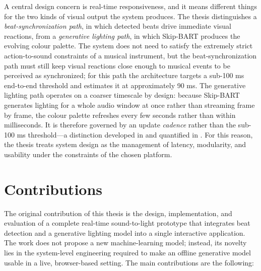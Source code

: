 A central design concern is real-time responsiveness, and it means different things for the two kinds of visual output the system produces. The thesis distinguishes a \emph{beat-synchronization path}, in which detected beats drive immediate visual reactions, from a \emph{generative lighting path}, in which Skip-BART produces the evolving colour palette. The system does not need to satisfy the extremely strict action-to-sound constraints of a musical instrument, but the beat-synchronization path must still keep visual reactions close enough to musical events to be perceived as synchronized; for this path the architecture targets a sub-100 ms end-to-end threshold and estimates it at approximately 90 ms. The generative lighting path operates on a coarser timescale by design: because Skip-BART generates lighting for a whole audio window at once rather than streaming frame by frame, the colour palette refreshes every few seconds rather than within milliseconds. It is therefore governed by an update \emph{cadence} rather than the sub-100 ms threshold---a distinction developed in  and quantified in . For this reason, the thesis treats system design as the management of latency, modularity, and usability under the constraints of the chosen platform.

\section{Contributions}

The original contribution of this thesis is the design, implementation, and evaluation of a complete real-time sound-to-light prototype that integrates beat detection and a generative lighting model into a single interactive application. The work does not propose a new machine-learning model; instead, its novelty lies in the system-level engineering required to make an offline generative model usable in a live, browser-based setting. The main contributions are the following:

